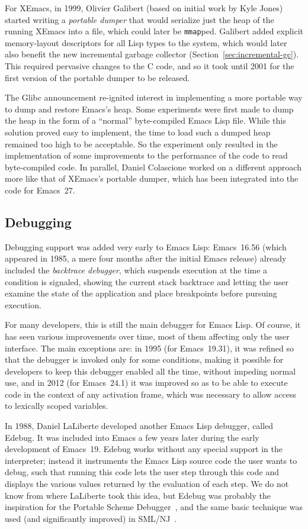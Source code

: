 \documentclass[format=acmsmall,screen]{acmart}
\newcommand \Elisp {Emacs Lisp}
\begin{document}
For XEmacs, in 1999, Olivier Galibert (based on initial work by Kyle
Jones) started writing a \emph{portable dumper} that would serialize
just the heap of the running XEmacs into a file, which could later be
\texttt{mmap}ped.  Galibert added explicit memory-layout descriptors
for all Lisp types to the system, which would later also benefit the
new incremental garbage collector (Section~\ref{sec:incremental-gc}).  This required pervasive changes to
the C code, and so it took until 2001 for the first version of the
portable dumper to be released.

The Glibc announcement re-ignited interest in implementing a more portable
way to dump and restore Emacs's heap.  Some experiments were first made to dump
the heap in the form of a ``normal'' byte-compiled \Elisp{} file.
While this solution proved easy to implement, the time to load such a dumped
heap remained too high to be acceptable.  So the experiment only resulted in
the implementation of some improvements to the performance of the code to
read byte-compiled code.  In parallel, Daniel Colascione worked on
a different approach more like that of XEmacs's portable dumper, which has
been integrated into the code for Emacs~27.

\subsection{Debugging}
\label{sec:debugger}

Debugging support was added very early to \Elisp: Emacs~16.56 (which
appeared in 1985, a mere four months after the initial Emacs release) already
included the \emph{backtrace debugger}, which suspends execution at the time
a condition is signaled, showing the current stack backtrace and
letting the user examine the state of the application and place breakpoints
before pursuing execution.

For many developers, this is still the main debugger for \Elisp{}.
Of course, it has seen various improvements over time, most of them
affecting only the user interface.  The main exceptions are:
in 1995 (for Emacs~19.31), it was refined so that the debugger is invoked
only for some conditions, making it possible for developers to keep this
debugger enabled all the time, without impeding normal use, and in 2012
(for Emacs~24.1) it was improved so as to be able to execute code in the
context of any activation frame, which was necessary to allow access to
lexically scoped variables.

In 1988, Daniel LaLiberte developed another \Elisp{} debugger, called
Edebug.  It was included into Emacs a few years later during the early
development of Emacs~19.  Edebug works without any special support in the
interpreter; instead it instruments the \Elisp{} source code the user wants to
debug, such that running this code lets the user step through this code and
displays the various values returned by the evaluation of each step.  We do
not know from where LaLiberte took this idea, but Edebug was probably the
inspiration for the Portable Scheme Debugger~\cite{Kellomaki93}, and the
same basic technique was used (and significantly improved) in
SML/NJ~\cite{Tolmach90}.
\end{document}

